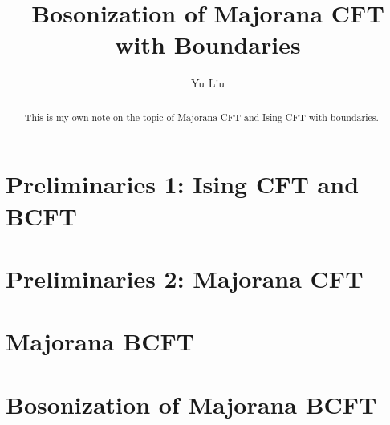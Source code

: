 \documentclass[12pt]{article}
\begin{document}
\title{\boldmath Bosonization of Majorana CFT with Boundaries}
\author{Yu Liu}

\maketitle

\begin{abstract}
This is my own note on the topic of Majorana CFT and Ising CFT with boundaries.

\end{abstract}

\tableofcontents


\newpage
\section{Preliminaries 1: Ising CFT and BCFT}\label{sec:Boundary Ising CFT} %


\section{Preliminaries 2: Majorana CFT}\label{sec:Majorana CFT} %



\newpage
\section{Majorana BCFT}\label{sec:Free Majorana Fermion BCFT} %


\newpage 
\section{Bosonization of Majorana BCFT}\label{sec:Bosonization of Majorana BCFT} %


% 

\newpage 

\end{document}
